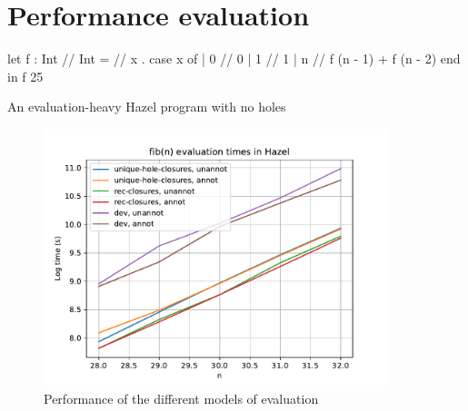 \chapter{Performance evaluation}
\label{sec:evaluation}

\begin{listing}
\begin{hminted}
let f : Int /\rar/ Int =
  /\lbd/ x . {
    case x of
    | 0 /\Rar/ 0
    | 1 /\Rar/ 1
    | n /\Rar/ f (n - 1) + f (n - 2)
    end
  }
in f 25  
\end{hminted}
\caption{An evaluation-heavy Hazel program with no holes}
\end{listing}

\begin{figure}
  \centering
  \includegraphics[width=10cm]{img/subst_evalenv_fib_perf.pdf}
  \caption{Performance of the different models of evaluation}
  \label{fig:perf_evaluation_models}
\end{figure}





